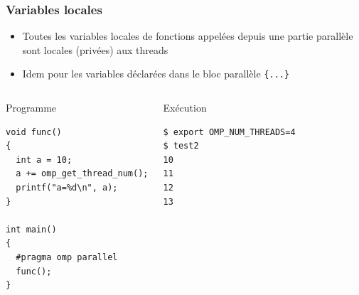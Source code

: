 \documentclass{beamer}
\begin{document}
\begin{frame}[fragile]
  \frametitle{Variables locales}

  \begin{itemize}
  \item   Toutes les variables locales de fonctions appelées depuis une partie
    parallèle sont locales (privées) aux threads

  \item    Idem pour les
  variables déclarées dans le bloc parallèle {\tt \{...\}}

  \end{itemize}

\small
\begin{columns}[t]
  \column[T]{5cm}
\begin{block}{Programme}
\begin{verbatim}
void func()
{
  int a = 10;
  a += omp_get_thread_num();
  printf("a=%d\n", a);
}

int main()
{
  #pragma omp parallel 
  func();
}
\end{verbatim}
\end{block}

\column[T]{5cm}
\begin{block}{Exécution}
\begin{verbatim}
$ export OMP_NUM_THREADS=4
$ test2
10
11
12
13
\end{verbatim}
\end{block}
\end{columns}

\normalsize
\end{frame}

\end{document}

